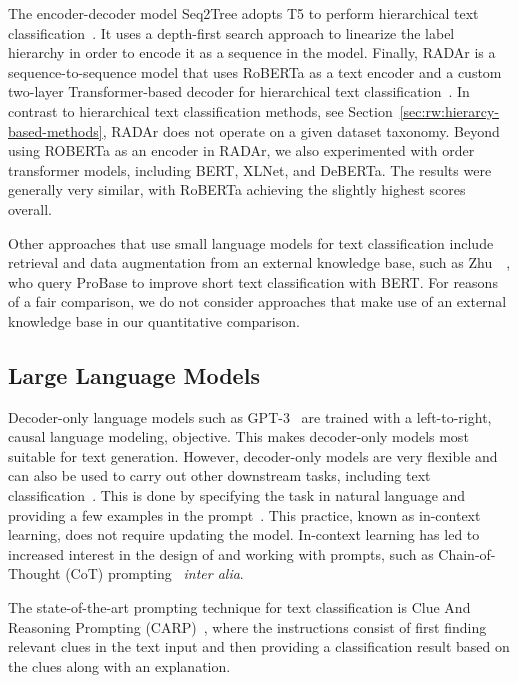 The encoder-decoder model Seq2Tree adopts T5 to perform hierarchical text classification~\cite{seq2tree}.
It uses a depth-first search approach to linearize the label hierarchy in order to encode it as a sequence in the model.
Finally, RADAr is a sequence-to-sequence model that uses RoBERTa as a text encoder and a custom two-layer Transformer-based decoder for hierarchical text classification~\cite{radar}.
In contrast to hierarchical text classification methods, see Section~\ref{sec:rw:hierarcy-based-methods}, RADAr does not operate on a given dataset taxonomy.
Beyond using ROBERTa as an encoder in RADAr, we also experimented with order transformer models, including BERT, XLNet, and DeBERTa. The results were generally very similar, with RoBERTa achieving the slightly highest scores overall.

Other approaches that use small language models for text classification include retrieval and data augmentation from an external knowledge base, such as Zhu~\etal~\cite{zhu2023}, who query ProBase to improve short text classification with BERT. For reasons of a fair comparison, we do not consider approaches that make use of an external knowledge base in our quantitative comparison.

\subsection{Large Language Models}

Decoder-only language models such as GPT-3~\cite{DBLP:conf/nips/BrownMRSKDNSSAA20} are trained with a left-to-right, \ie causal language modeling, objective. This makes decoder-only models most suitable for text generation. 
However, decoder-only models are very flexible and can also be used to carry out other downstream tasks, including text classification~\cite{DBLP:conf/nips/BrownMRSKDNSSAA20,radfordLanguageModelsAre}. 
This is done by specifying the task in natural language and providing a few examples in the prompt~\cite{DBLP:conf/nips/BrownMRSKDNSSAA20}. 
This practice, known as in-context learning, does not require updating the model. 
In-context learning has led to increased interest in the design of and working with prompts, such as Chain-of-Thought (CoT) prompting~\cite{weiChainofThoughtPromptingElicits2023} \emph{inter alia}.

The state-of-the-art prompting technique for text classification is Clue And Reasoning Prompting (CARP)~\cite{carp}, where the instructions consist of first finding relevant clues in the text input and then providing a classification result based on the clues along with an explanation. 

